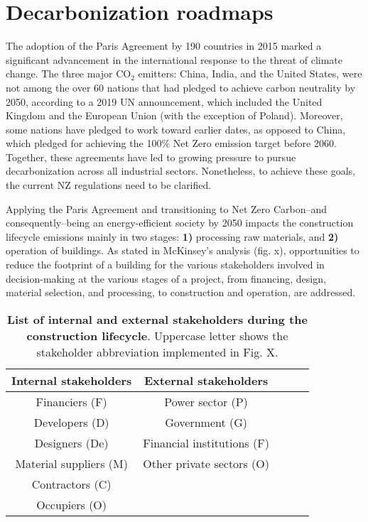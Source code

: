 \section{Decarbonization roadmaps}
\label{sec:decarbonization_roadmaps}

The adoption of the Paris Agreement by 190 countries in 2015 marked a significant advancement in the international response to the threat of climate change. The three major CO$_2$ emitters: China, India, and the United States, were not among the over 60 nations that had pledged to achieve carbon neutrality by 2050, according to a 2019 UN announcement, which included the United Kingdom and the European Union (with the exception of Poland).\autocite{summit2019report} Moreover, some nations have pledged to work toward earlier dates, as opposed to China, which pledged for achieving the 100\% Net Zero emission target before 2060.\autocite{moghaddasi2021net} Together, these agreements have led to growing pressure to pursue decarbonization across all industrial sectors.\autocite{hoffmann2021decarbonization} Nonetheless, to achieve these goals, the current NZ regulations need to be clarified.\autocite{moghaddasi2021net}

Applying the Paris Agreement and transitioning to Net Zero Carbon–and consequently–being an energy-efficient society by 2050 impacts the construction lifecycle emissions mainly in two stages: \textbf{1)} processing raw materials, and \textbf{2)} operation of buildings. As stated in McKinsey's analysis\autocite{mckinsey_2020} (fig. x), opportunities to reduce the footprint of a building for the various stakeholders involved in decision-making at the various stages of a project, from financing, design, material selection, and processing, to construction and operation, are addressed. 

\begin{table}[!htb]
  \caption[List of internal and external stakeholders during the construction lifecycle]{\textbf{List of internal and external stakeholders during the construction lifecycle}. Uppercase letter shows the stakeholder abbreviation implemented in Fig. X.}
  \begin{scriptsize}
    \begin{tabulary}{0.65\linewidth}{ccccc}
      \textbf{Internal stakeholders} & \textbf{External stakeholders}  \\ \hline
      Financiers (F) &  Power sector (P) \\
      Developers (D) &  Government (G)   \\
      Designers (De) &  Financial institutions (F) \\
      Material suppliers (M) &  Other private sectors (O) \\
      Contractors (C) & \\
      Occupiers (O) & \\
    \end{tabulary}
  \end{scriptsize}
  \label{tab:stakeholders}
\end{table}

